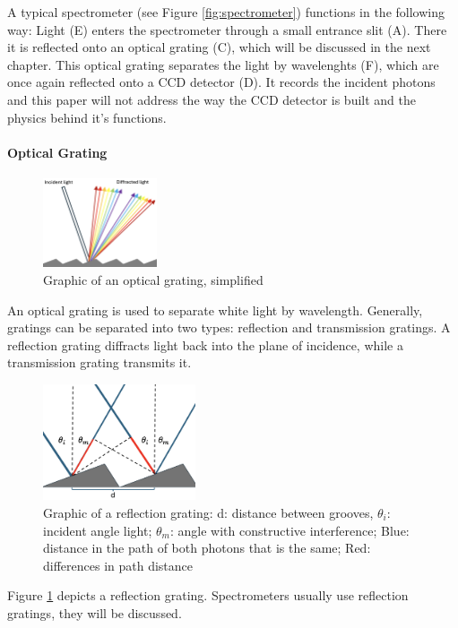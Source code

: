 \bigskip

A typical spectrometer (see Figure \ref{fig:spectrometer}) functions in the following way: Light (E) enters the spectrometer through a small entrance slit (A). There it is reflected onto an optical grating (C), which will be discussed in the next chapter. This optical grating separates the light by wavelenghts (F), which are once again reflected onto a CCD detector (D). It records the incident photons and this paper will not address the way the CCD detector is built and the physics behind it's functions.\cite{wikigrating}

\paragraph{Optical Grating}

\begin{figure} %
    \centering
    \includegraphics[width=0.3\textwidth]{images/setup_graphics/optical_grating.png}
    \caption{Graphic of an optical grating, simplified}
    \label{fig:grating}
    \vspace{-20pt}
\end{figure}

An optical grating is used to separate white light by wavelength. Generally, gratings can be separated into two types: reflection and transmission gratings. A reflection grating diffracts light back into the plane of incidence, while a transmission grating transmits it. 
\begin{figure}
    \centering
    \includegraphics[width=0.4\textwidth]{images/setup_graphics/grating_graphic.png}
    \caption{Graphic of a reflection grating: d: distance between grooves, \(\theta_i\): incident angle light; \(\theta_m\): angle with constructive interference; Blue: distance in the path of both photons that is the same; Red: differences in path distance}
    \label{fig:grating_graphic}
\end{figure}
Figure \ref{fig:grating} depicts a reflection grating. Spectrometers usually use reflection gratings, they will be discussed.

